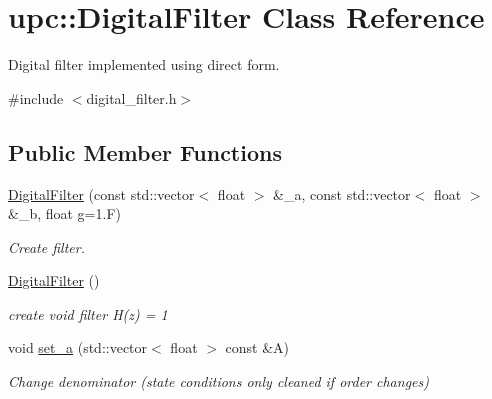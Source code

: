 \hypertarget{classupc_1_1DigitalFilter}{}\section{upc\+:\+:Digital\+Filter Class Reference}
\label{classupc_1_1DigitalFilter}


Digital filter implemented using direct form.  




{\ttfamily \#include $<$digital\+\_\+filter.\+h$>$}

\subsection*{Public Member Functions}
\begin{DoxyCompactItemize}
\item 
\mbox{\label{classupc_1_1DigitalFilter_a3d8e61b92170380d06b26aee1ebc1f16}} 
\hyperlink{classupc_1_1DigitalFilter_a3d8e61b92170380d06b26aee1ebc1f16}{Digital\+Filter} (const std\+::vector$<$ float $>$ \&\+\_\+a, const std\+::vector$<$ float $>$ \&\+\_\+b, float g=1.\+F)
\begin{DoxyCompactList}\small\item\em Create filter. \end{DoxyCompactList}\item 
\mbox{\label{classupc_1_1DigitalFilter_ac3c32e0d51a88354482f13528e9a7842}} 
\hyperlink{classupc_1_1DigitalFilter_ac3c32e0d51a88354482f13528e9a7842}{Digital\+Filter} ()
\begin{DoxyCompactList}\small\item\em create void filter H(z) = 1 \end{DoxyCompactList}\item 
\mbox{\label{classupc_1_1DigitalFilter_ade3c3a24bbfbc1b2edbf4bcd0885a9e6}} 
void \hyperlink{classupc_1_1DigitalFilter_ade3c3a24bbfbc1b2edbf4bcd0885a9e6}{set\+\_\+a} (std\+::vector$<$ float $>$ const \&A)
\begin{DoxyCompactList}\small\item\em Change denominator (state conditions only cleaned if order changes) \end{DoxyCompactList}\item 
\mbox{\label{classupc_1_1DigitalFilter_a9f23a5e9db027eb0c9b70bd9b5d08e09}} 

\end{DoxyCompactItemize}
